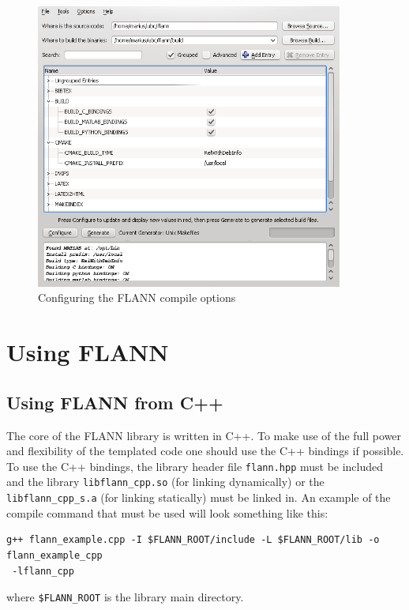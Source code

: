 \documentclass[letter,10pt]{article}
\begin{document}
\begin{figure}[h]
  \begin{center}
    \includegraphics[width=0.9\textwidth]{images/cmake-gui.png}
    \caption{Configuring the FLANN compile options}
    \label{fig:cmake-gui}
  \end{center}
\end{figure}




\section{Using FLANN}

\subsection{Using FLANN from C++}

The core of the FLANN library is written in C++. To make use of the full power 
and flexibility of the templated code one should use the C++ bindings if possible. 
To use the C++ bindings, the library header file \texttt{flann.hpp} must be included 
and the library \texttt{libflann\_cpp.so} (for linking dynamically) or
the \texttt{libflann\_cpp\_s.a} (for linking statically) must be linked in. An example
of the compile command that must be used will look something like this:
\begin{Verbatim}[fontsize=\footnotesize]
g++ flann_example.cpp -I $FLANN_ROOT/include -L $FLANN_ROOT/lib -o flann_example_cpp
 -lflann_cpp
\end{Verbatim}
where \texttt{\$FLANN\_ROOT} is the library main directory.
\end{document}
